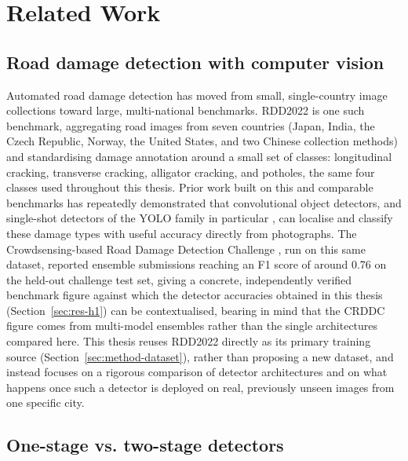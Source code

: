 \documentclass[10pt,a4paper,twocolumn]{article}
\begin{document}
\section{Related Work}
\label{sec:related-work}

\subsection{Road damage detection with computer vision}
\label{sec:rw-damage-detection}

Automated road damage detection has moved from small, single-country
image collections toward large, multi-national benchmarks. RDD2022
\citep{arya2024rdd2022} is one such benchmark, aggregating road images
from seven countries (Japan, India, the Czech Republic, Norway, the
United States, and two Chinese collection methods) and standardising
damage annotation around a small set of classes: longitudinal cracking,
transverse cracking, alligator cracking, and potholes, the same four
classes used throughout this thesis. Prior work built on this and
comparable benchmarks has repeatedly demonstrated that convolutional
object detectors, and single-shot detectors of the YOLO family in
particular \citep{redmon2016yolo,jocher2023ultralytics}, can localise and
classify these damage types with useful accuracy directly from
photographs. The Crowdsensing-based Road Damage Detection Challenge
\citep{arya2022crddc}, run on this same dataset, reported ensemble
submissions reaching an F1 score of around 0.76 on the held-out
challenge test set, giving a concrete, independently verified benchmark
figure against which the detector accuracies obtained in this thesis
(Section~\ref{sec:res-h1}) can be contextualised, bearing in mind that
the CRDDC figure comes from multi-model ensembles rather than the single
architectures compared here. This thesis reuses RDD2022 directly as its
primary training source (Section~\ref{sec:method-dataset}), rather than
proposing a new dataset, and instead focuses on a rigorous comparison of
detector architectures and on what happens once such a detector is
deployed on real, previously unseen images from one specific city.

\subsection{One-stage vs. two-stage detectors}
\label{sec:rw-detector-architectures}
\end{document}
